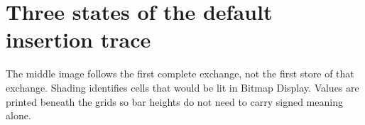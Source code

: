 \section{Three states of the default insertion
  trace}\label{009-sorting-visualizer-x-bars-three-states-of-the-default-insertion-trace}

The middle image follows the first complete exchange, not the first
store of that exchange. Shading identifies cells that would be lit in
Bitmap Display. Values are printed beneath the grids so bar heights do
not need to carry signed meaning alone.


